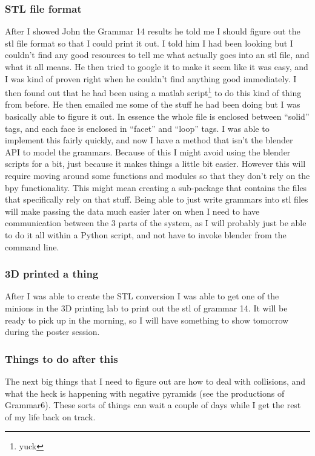 \documentclass[letterpaper,oneside,titlepage]{article}
\begin{document}
\subsubsection{STL file format}
After I showed John the Grammar 14 results he told me I should figure out the stl file format so that I could print it out.  I told him I had been looking but I couldn't find any good resources to tell me what actually goes into an stl file, and what it all means.  He then tried to google it to make it seem like it was easy, and I was kind of proven right when he couldn't find anything good immediately.  I then found out that he had been using a matlab script\footnote{yuck} to do this kind of thing from before.  He then emailed me some of the stuff he had been doing but I was basically able to figure it out.  In essence the whole file is enclosed between ``solid'' tags, and each face is enclosed in ``facet'' and ``loop'' tags.  I was able to implement this fairly quickly, and now I have a method that isn't the blender API to model the grammars.  Because of this I might avoid using the blender scripts for a bit, just because it makes things a little bit easier.  However this will require moving around some functions and modules so that they don't rely on the bpy functionality.  This might mean creating a sub-package that contains the files that specifically rely on that stuff.  Being able to just write grammars into stl files will make passing the data much easier later on when I need to have communication between the 3 parts of the system, as I will probably just be able to do it all within a Python script, and not have to invoke blender from the command line.

\subsubsection{3D printed a thing}
After I was able to create the STL conversion I was able to get one of the minions in the 3D printing lab to print out the stl of grammar 14.  It will be ready to pick up in the morning, so I will have something to show tomorrow during the poster session.

\subsubsection{Things to do after this}
The next big things that I need to figure out are how to deal with collisions, and what the heck is happening with negative pyramids (see the productions of Grammar6).  These sorts of things can wait a couple of days while I get the rest of my life back on track.





\end{document}
